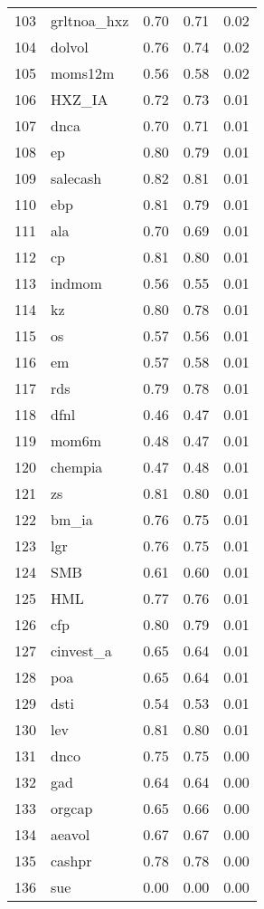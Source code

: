 \documentclass[12pt]{article}
\begin{document}
\begin{footnotesize}
\begin{longtable}{rl|c|c|c}
		103 & grltnoa\_hxz & 0.70 & 0.71 & 0.02 \\ 
		104 & dolvol & 0.76 & 0.74 & 0.02 \\ 
		105 & moms12m & 0.56 & 0.58 & 0.02 \\ 
		106 & HXZ\_IA & 0.72 & 0.73 & 0.01 \\ 
		107 & dnca & 0.70 & 0.71 & 0.01 \\ 
		108 & ep & 0.80 & 0.79 & 0.01 \\ 
		109 & salecash & 0.82 & 0.81 & 0.01 \\ 
		110 & ebp & 0.81 & 0.79 & 0.01 \\ 
		111 & ala & 0.70 & 0.69 & 0.01 \\ 
		112 & cp & 0.81 & 0.80 & 0.01 \\ 
		113 & indmom & 0.56 & 0.55 & 0.01 \\ 
		114 & kz & 0.80 & 0.78 & 0.01 \\ 
		115 & os & 0.57 & 0.56 & 0.01 \\ 
		116 & em & 0.57 & 0.58 & 0.01 \\ 
		117 & rds & 0.79 & 0.78 & 0.01 \\ 
		118 & dfnl & 0.46 & 0.47 & 0.01 \\ 
		119 & mom6m & 0.48 & 0.47 & 0.01 \\ 
		120 & chempia & 0.47 & 0.48 & 0.01 \\ 
		121 & zs & 0.81 & 0.80 & 0.01 \\ 
		122 & bm\_ia & 0.76 & 0.75 & 0.01 \\ 
		123 & lgr & 0.76 & 0.75 & 0.01 \\ 
		124 & SMB & 0.61 & 0.60 & 0.01 \\ 
		125 & HML & 0.77 & 0.76 & 0.01 \\ 
		126 & cfp & 0.80 & 0.79 & 0.01 \\ 
		127 & cinvest\_a & 0.65 & 0.64 & 0.01 \\ 
		128 & poa & 0.65 & 0.64 & 0.01 \\ 
		129 & dsti & 0.54 & 0.53 & 0.01 \\ 
		130 & lev & 0.81 & 0.80 & 0.01 \\ 
		131 & dnco & 0.75 & 0.75 & 0.00 \\ 
		132 & gad & 0.64 & 0.64 & 0.00 \\ 
		133 & orgcap & 0.65 & 0.66 & 0.00 \\ 
		134 & aeavol & 0.67 & 0.67 & 0.00 \\ 
		135 & cashpr & 0.78 & 0.78 & 0.00 \\ 
		136 & sue & 0.00 & 0.00 & 0.00 \\ 

\end{longtable}
\end{footnotesize}
\end{document}
